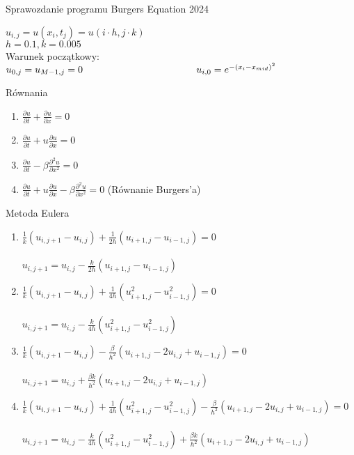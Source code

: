\documentclass[12pt, a4paper]{report}
\begin{document}
\begin{center}
\large{Sprawozdanie programu Burgers Equation 2024}
\end{center}

$u_{i,j}=u(x_{i},t_{j})=u(i\cdot h,j\cdot k)$\\
$h=0.1, k=0.005$\\
Warunek początkowy: $u_{0,j}=u_{M-1,j}=0\\
\hspace*{4.1cm} u_{i,0}=e^{-(x_{i}-x_{mid})^{2}}$

\begin{center}
\large{Równania}
\end{center}
\begin{enumerate}
\item $\frac{\partial u}{\partial t}+\frac{\partial u}{\partial x}=0$
\item $\frac{\partial u}{\partial t}+u\frac{\partial u}{\partial x}=0$
\item $\frac{\partial u}{\partial t}-\beta\frac{\partial^{2} u}{\partial x^{2}}=0$
\item $\frac{\partial u}{\partial t}+u\frac{\partial u}{\partial x}-\beta\frac{\partial^{2} u}{\partial x^{2}}=0$ (Równanie Burgers'a)
\end{enumerate}

\begin{center}
\large{Metoda Eulera}
\end{center}

\begin{enumerate}
\item$\frac{1}{k}(u_{i,j+1}-u_{i,j})+\frac{1}{2h}(u_{i+1,j}-u_{i-1,j})=0$\\\\
$u_{i,j+1}=u_{i,j}-\frac{k}{2h}(u_{i+1,j}-u_{i-1,j})$

\item$\frac{1}{k}(u_{i,j+1}-u_{i,j})+\frac{1}{4h}(u_{i+1,j}^{2}-u_{i-1,j}^{2})=0$\\\\
$u_{i,j+1}=u_{i,j}-\frac{k}{4h}(u_{i+1,j}^{2}-u_{i-1,j}^{2})$

\item$\frac{1}{k}(u_{i,j+1}-u_{i,j})-\frac{\beta}{h^{2}}(u_{i+1,j}-2u_{i,j}+u_{i-1,j})=0$\\\\
$u_{i,j+1}=u_{i,j}+\frac{\beta k}{h^{2}}(u_{i+1,j}-2u_{i,j}+u_{i-1,j})$

\item$\frac{1}{k}(u_{i,j+1}-u_{i,j})+\frac{1}{4h}(u_{i+1,j}^{2}-u_{i-1,j}^{2})-\frac{\beta}{h^{2}}(u_{i+1,j}-2u_{i,j}+u_{i-1,j})=0$\\\\
$u_{i,j+1}=u_{i,j}-\frac{k}{4h}(u_{i+1,j}^{2}-u_{i-1,j}^{2})+\frac{\beta k}{h^{2}}(u_{i+1,j}-2u_{i,j}+u_{i-1,j})$
\end{enumerate}
\end{document}
